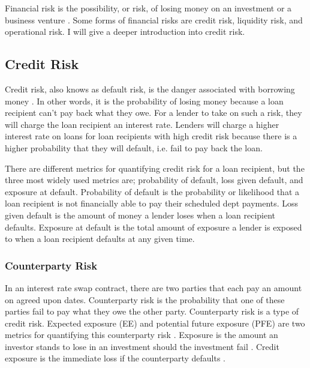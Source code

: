 \noindent Financial risk is the possibility, or risk, of losing money on an investment or a business venture \cite{investopedia_financial_risk}. Some forms of financial risks are credit risk, liquidity risk, and operational risk. I will give a deeper introduction into credit risk.

\subsection{Credit Risk}

\noindent Credit risk, also knows as default risk, is the danger associated with borrowing money \cite{investopedia_financial_risk}. In other words, it is the probability of losing money because a loan recipient can't pay back what they owe. For a lender to take on such a risk, they will charge the loan recipient an interest rate. Lenders will charge a higher interest rate on loans for loan recipients with high credit risk because there is a higher probability that they will default, i.e. fail to pay back the loan.

There are different metrics for quantifying credit risk for a loan recipient, but the three most widely used metrics are; probability of default, loss given default, and exposure at default. Probability of default is the probability or likelihood that a loan recipient is not financially able to pay their scheduled dept payments. Loss given default is the amount of money a lender loses when a loan recipient defaults. Exposure at default is the total amount of exposure a lender is exposed to when a loan recipient defaults at any given time. \cite{investopedia_quantify_credit_risk}


\subsubsection{Counterparty Risk}

\noindent In an interest rate swap contract, there are two parties that each pay an amount on agreed upon dates. Counterparty risk is the probability that one of these parties fail to pay what they owe the other party. Counterparty risk is a type of credit risk. Expected exposure (EE) and potential future exposure (PFE) are two metrics for quantifying this counterparty risk \cite{investopedia_understanding_counterparty_risk}. Exposure is the amount an investor stands to lose in an investment should the investment fail \cite{investopedia_exposure}. Credit exposure is the immediate loss if the counterparty defaults \cite{investopedia_understanding_counterparty_risk}.

